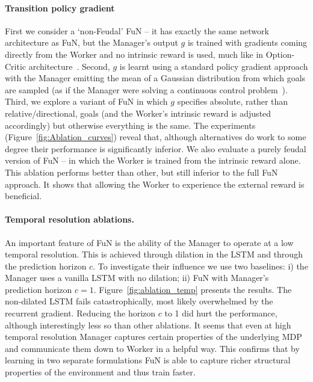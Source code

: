 \paragraph{Transition policy gradient} First we consider a `non-Feudal' FuN -- it has exactly the same network architecture as FuN, but the Manager’s output $g$ is trained with gradients coming directly from the Worker and no intrinsic reward is used, much like in Option-Critic architecture~\cite{bacon2015option}.  Second, $g$ is learnt using a standard policy gradient approach with the Manager emitting the mean of a Gaussian distribution from which goals are sampled (as if the Manager were solving a continuous control problem~\cite{schulman2015gae,mnih2016asynchronous,lillicrap2015continuous}). Third, we explore a variant of FuN in which $g$ specifies absolute, rather than relative/directional, goals (and the Worker's intrinsic reward is adjusted accordingly) but otherwise everything is the same.
The experiments (Figure~\ref{fig:Ablation_curves}) reveal that, although alternatives do work to some degree their performance is significantly inferior. We also evaluate a purely feudal version of FuN -- in which the Worker is trained from the intrinsic reward alone. This ablation performs better than other, but still inferior to the full FuN approach. It shows that allowing the Worker to experience the external reward is beneficial. 

\paragraph{Temporal resolution ablations.}  An important feature of FuN is the ability of the Manager to operate at a low temporal resolution. This is achieved through dilation in the LSTM and through the prediction horizon $c$. To investigate their influence we use two baselines:
i) the Manager uses a vanilla LSTM with no dilation; ii) FuN with Manager's prediction horizon $c=1$. Figure~\ref{fig:ablation_temp} presents the results. The non-dilated LSTM fails catastrophically, most likely overwhelmed by the recurrent gradient. Reducing the horizon $c$ to 1 did hurt the performance, although interestingly less so than other ablations. It seems that even at high temporal resolution Manager captures certain properties of the underlying MDP and communicate them down to Worker in a helpful way. This confirms that by learning in two separate formulations FuN is able to capture richer structural properties of the environment and thus train faster. 


